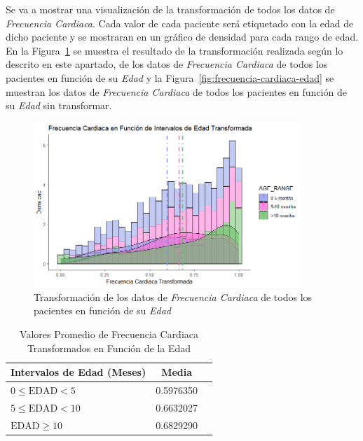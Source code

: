 Se va a mostrar una visualización de la transformación de todos los datos de \textit{Frecuencia Cardiaca}. Cada valor de cada paciente será etiquetado con la edad de dicho paciente y se mostraran en un gráfico de densidad para cada rango de edad. En la Figura~\ref{fig:transformacion-frecuencia-cardiaca-edad} se muestra el resultado de la transformación realizada según lo descrito en este apartado, de los datos de \textit{Frecuencia Cardiaca} de todos los pacientes en función de su \textit{Edad} y la Figura~\ref{fig:frecuencia-cardiaca-edad} se muestran los datos de \textit{Frecuencia Cardiaca} de todos los pacientes en función de su \textit{Edad} sin transformar.

\begin{figure}[H]
    \centering
    \includegraphics[width=0.9\textwidth]{img/transformacion-frecuencia-cardiaca-edad.png}
    \caption{Transformación de los datos de \textit{Frecuencia Cardiaca} de todos los pacientes en función de su \textit{Edad}}\label{fig:transformacion-frecuencia-cardiaca-edad}
\end{figure}

\begin{table}[H]
    \centering
    \begin{tabular}{lcc}
        \toprule
        \textbf{Intervalos de Edad (Meses)} & \textbf{Media} \\
        \midrule
        $0 \leq \text{EDAD} < 5$ & 0.5976350 \\
        $5 \leq \text{EDAD} < 10$ & 0.6632027 \\
        $\text{EDAD} \geq 10$ & 0.6829290 \\
        \bottomrule
    \end{tabular}
    \caption{Valores Promedio de Frecuencia Cardiaca Transformados en Función de la Edad}\label{tabla:frecuencia-cardiaca-edad-transformada}
\end{table}

